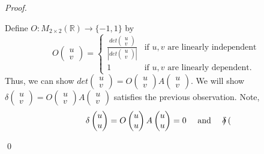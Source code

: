\documentclass[12pt]{article}
\newenvironment{sol}
    {\emph{Proof.}
    }
    {
    \qed
    }
\begin{document}
\begin{sol}
Define $O : M_{2 \times 2}(\mathbb{R}) \to \{-1, 1\}$ by $$O\begin{pmatrix}
u \\ v
\end{pmatrix} = \begin{cases} 
            \frac{det\begin{pmatrix}
            u \\ v
            \end{pmatrix}}{\left| det\begin{pmatrix}
            u \\ v
            \end{pmatrix} \right|} & \text{if $u,v$ are linearly independent} \\
            1 & \text{if $u,v$ are linearly dependent.}
        \end{cases}$$
Thus, we can show $det\begin{pmatrix}
u \\ v
\end{pmatrix} = O\begin{pmatrix}
u \\ v
\end{pmatrix}A\begin{pmatrix}
u \\ v
\end{pmatrix}$. We will show $\delta\begin{pmatrix}
u \\ v
\end{pmatrix} = O\begin{pmatrix}
u \\ v
\end{pmatrix}A\begin{pmatrix}
u \\ v
\end{pmatrix}$ satisfies the previous observation. Note, $$\delta\begin{pmatrix}
u \\ u
\end{pmatrix} = O\begin{pmatrix}
u \\ u
\end{pmatrix}A\begin{pmatrix}
u \\ u
\end{pmatrix} = 0 \text{\hspace{1em} and \hspace{1em}} \delta\begin{pmatrix}

\end{pmatrix}$$
\end{sol}
\end{document}
